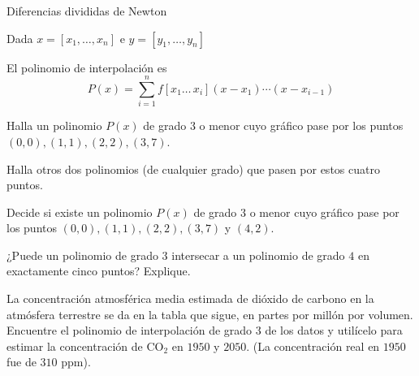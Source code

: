 \begin{questions}
    \begin{algorithm}[H]
        \caption{Diferencias divididas de Newton}\label{algo:updateL}
        Dada $x=\left[x_{1},\dotsc,x_{n}\right]$ e $y=\left[y_{1},\dotsc,y_{n}\right]$\;
    \end{algorithm}
    El polinomio de interpolación es
    \begin{equation*}
        P\left(x\right)=
        \sum_{i=1}^{n}
        f\left[x_{1}\dotsc\, x_{i}\right]
        \left(x-x_{1}\right)\cdots\left(x-x_{i-1}\right)
    \end{equation*}

    \question

    Halla un polinomio $P\left(x\right)$ de grado $3$ o menor
    cuyo gráfico pase por los puntos
    \begin{math}
        \left(0,0\right),
        \left(1,1\right),
        \left(2,2\right),
        \left(3,7\right)
    \end{math}.

    \question Halla otros dos polinomios (de cualquier grado) que
    pasen por estos cuatro puntos.

    \question
    Decide si existe un polinomio $P\left(x\right)$ de grado $3$
    o menor cuyo gráfico pase por los puntos
    \begin{math}
        \left(0,0\right),
        \left(1,1\right),
        \left(2,2\right),
        \left(3,7\right)
    \end{math}
    y
    \begin{math}
        \left(4,2\right)
    \end{math}.

    \question

    ¿Puede un polinomio de grado $3$ intersecar a un polinomio de
    grado $4$ en exactamente cinco puntos?
    Explique.

    \question

    La concentración atmosférica media estimada de dióxido de carbono
    en la atmósfera terrestre se da en la tabla que sigue, en partes
    por millón por volumen.
    Encuentre el polinomio de interpolación de grado $3$ de los datos
    y utilícelo para estimar la concentración de CO$_{2}$ en $1950$ y $2050$.
    (La concentración real en $1950$ fue de $310$ ppm).


\end{questions}
